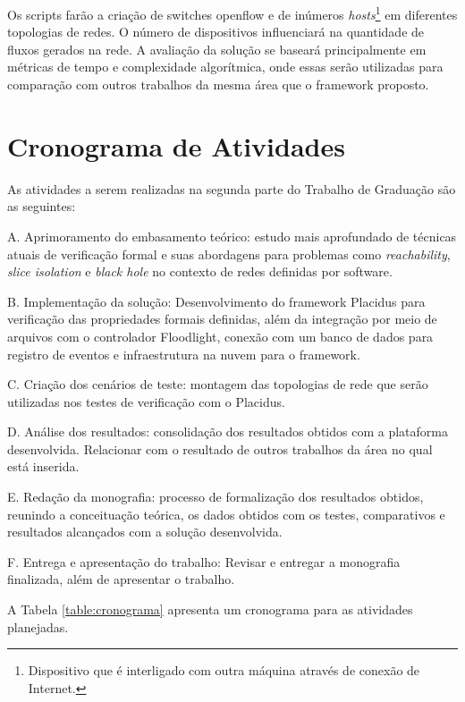\documentclass[12pt]{article}
\begin{document}
Os scripts farão a criação de switches openflow e de inúmeros \textit{hosts}\footnote{Dispositivo que é interligado com outra máquina através de conexão de Internet.} em diferentes topologias de redes.
O número de dispositivos influenciará na quantidade de fluxos gerados na rede.
A avaliação da solução se baseará principalmente em métricas de tempo e complexidade algorítmica, onde essas serão utilizadas para comparação com outros trabalhos da mesma área que o framework proposto.

\section{Cronograma de Atividades}
As atividades a serem realizadas na segunda parte do Trabalho de Graduação são as seguintes:

A. Aprimoramento do embasamento teórico: estudo mais aprofundado de técnicas atuais de verificação formal e suas abordagens para problemas como \textit{reachability}, \textit{slice isolation} e \textit{black hole} no contexto de redes definidas por software.

B. Implementação da solução: Desenvolvimento do framework Placidus para verificação das propriedades formais definidas, além da integração por meio de arquivos com o controlador Floodlight, conexão com um banco de dados para registro de eventos e infraestrutura na nuvem para o framework.

C. Criação dos cenários de teste: montagem das topologias de rede que serão utilizadas nos testes de verificação com o Placidus.

D. Análise dos resultados: consolidação dos resultados obtidos com a plataforma desenvolvida. Relacionar com o resultado de outros trabalhos da área no qual está inserida.

E. Redação da monografia: processo de formalização dos resultados obtidos, reunindo a conceituação teórica, os dados obtidos com os testes, comparativos e resultados alcançados com a solução desenvolvida.

F. Entrega e apresentação do trabalho: Revisar e entregar a monografia finalizada, além de apresentar o trabalho.

A Tabela \ref{table:cronograma} apresenta um cronograma para as atividades planejadas.
\end{document}
